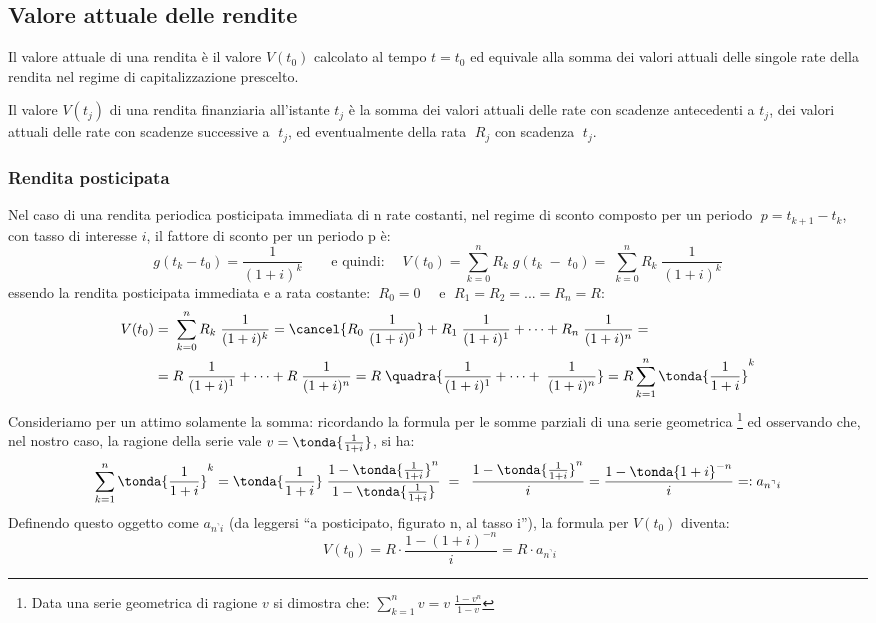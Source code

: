 \subsection{Valore attuale delle rendite}
Il valore attuale di una rendita è il valore \(V(t_0)\)  calcolato al tempo \(t = 
t_0\)  ed equivale alla somma dei valori attuali delle singole rate della 
rendita nel regime di capitalizzazione prescelto.

Il valore \(V(t_j)\) di una rendita finanziaria all'istante \(t_j\) è la somma dei valori
attuali delle rate con scadenze antecedenti a \(t_j\), dei valori attuali delle rate con 
scadenze successive a \(\;t_j\), ed eventualmente della rata \(\;R_j\) con scadenza 
\(\;t_j\).

\subsubsection{Rendita posticipata}

Nel caso di una rendita periodica posticipata immediata di n rate costanti, nel 
regime di sconto composto per un periodo \(\; p= 
t_{k+1}-t_k\), con tasso di interesse \(i\), il fattore di sconto per un periodo p è:
\[g(t_k-t_0)=\frac{1}{(1+i)^k} \qquad \text{e quindi:} \quad \; V(t_0)=\sum^{n}_{k=0}R_k \; g(t_k\;-\;t_0)= \; \sum^{n}_{k=0}R_k \; 
\frac{1}{(1+i)^k}\]
essendo la rendita posticipata immediata e a rata costante: \(\;R_{0}=0 \quad\) e 
\(\;R_{1}=R_{2}=...=R_{n}=R\):
\[\begin{aligned}
   V(t_0)&=\; \sum^{n}_{k=0}R_k \; \frac{1}{(1+i)^k} =\cancel{R_0 \; 
\frac{1}{(1+i)^0}}+R_1 \; 
\frac{1}{(1+i)^1}+\dots+R_n \; 
\frac{1}{(1+i)^n} =\\
&= R\; 
\frac{1}{(1+i)^1}+\dots+R \; 
\frac{1}{(1+i)^n} = R\; \quadra{
\frac{1}{(1+i)^1}+\dots+\; 
\frac{1}{(1+i)^n}} = R \sum^{n}_{k=1}\tonda{\frac{1}{1+i}}^k 
  \end{aligned}
\]
Consideriamo per un attimo solamente la somma: ricordando la formula per le somme parziali di una serie geometrica
\footnote{Data una serie geometrica di ragione \(v\) si dimostra che: 
\(\displaystyle \sum^{n}_{k=1} v = v\; \frac{1-v^n}{1-v}\)} ed osservando che, nel nostro caso, la ragione
della serie vale \(v = \tonda{\frac{1}{1+i}}\), si ha:
\[\sum^{n}_{k=1}\tonda{\frac{1}{1+i}}^k = \tonda{\frac{1}{1+i}} 
\;\frac{1-\tonda{\frac{1}{1+i}} ^n}{1-\tonda{\frac{1}{1+i}} }\; = \;\; 
\frac{1-\tonda{\frac{1}{1+i}} ^n}{i} = \frac{1-\tonda{1+i} ^{-n}}{i} =: a_{n^\urcorner i}\]
Definendo questo oggetto come \(a_{n^\urcorner i}\) (da 
leggersi ``a posticipato, figurato n, al tasso i''), la formula per \(V(t_0)\) diventa:
\[\; V(t_0)= R\cdot\frac{1-(1+i)^{-n}}{i}= R\cdot a_{n^\urcorner i}\]

